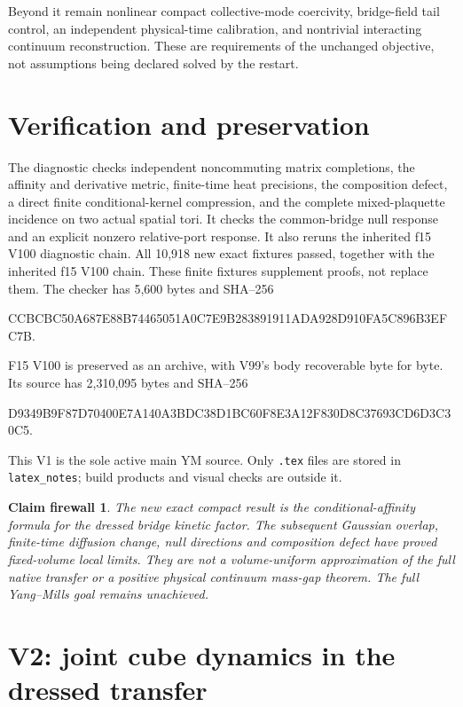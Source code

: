 \documentclass[11pt,oneside]{article}
\newtheorem{firewall}[theorem]{Claim firewall}
\begin{document}
Beyond it remain nonlinear compact collective-mode coercivity,
bridge-field tail control, an independent physical-time calibration,
and nontrivial interacting continuum reconstruction. These are
requirements of the unchanged objective, not assumptions being
declared solved by the restart.

\section{Verification and preservation}
\label{f16v1:verification}

The diagnostic
checks independent noncommuting matrix completions,
the affinity and derivative metric, finite-time heat precisions,
the composition defect, a direct finite conditional-kernel
compression, and the complete mixed-plaquette incidence on
two actual spatial tori. It checks the common-bridge null
response and an explicit nonzero relative-port response.
It also reruns the inherited f15 V100 diagnostic chain.
All 10,918 new exact fixtures passed, together with the inherited
f15 V100 chain. These finite fixtures supplement proofs, not replace them.
The checker has 5,600 bytes and SHA--256
\begin{center}\scriptsize\ttfamily
CCBCBC50A687E88B74465051A0C7E9B283891911ADA928D910FA5C896B3EFC7B.
\end{center}

F15 V100 is preserved as an archive, with V99's body recoverable
byte for byte. Its source has 2,310,095 bytes and SHA--256
\begin{center}\scriptsize\ttfamily
D9349B9F87D70400E7A140A3BDC38D1BC60F8E3A12F830D8C37693CD6D3C30C5.
\end{center}
This V1 is the sole active main YM source.
Only \texttt{.tex} files are stored in \texttt{latex\_notes};
build products and visual checks are outside it.

\begin{firewall}
The new exact compact result is the conditional-affinity formula
for the dressed bridge kinetic factor. The subsequent Gaussian
overlap, finite-time diffusion change, null directions and
composition defect have proved fixed-volume local limits.
They are not a volume-uniform approximation of the full native
transfer or a positive physical continuum mass-gap theorem.
The full Yang--Mills goal remains unachieved.
\end{firewall}

\section{V2: joint cube dynamics in the dressed transfer}
\label{f16v2:context}
\end{document}
